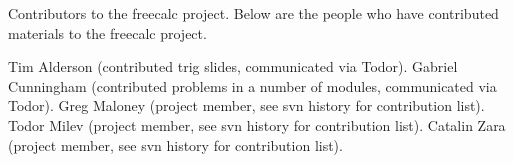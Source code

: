 Contributors to the freecalc project. Below are the people who have contributed materials to the freecalc project. 

Tim Alderson (contributed trig slides, communicated via Todor).
Gabriel Cunningham (contributed problems in a number of modules, communicated via Todor).
Greg Maloney (project member, see svn history for contribution list).
Todor Milev (project member, see svn history for contribution list).
Catalin Zara (project member, see svn history for contribution list).
